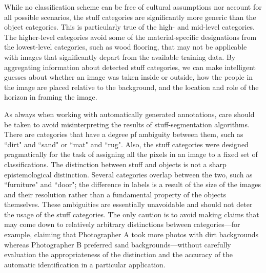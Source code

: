 \documentclass[10pt, a4paper]{article}
\begin{document}
While no classification scheme
can be free of cultural assumptions nor account for all possible scenarios,
the stuff categories are significantly more generic than the object categories.
This is particularly true of the high- and mid-level categories. The
higher-level categories avoid some of the material-specific designations from
the lowest-level categories, such as wood flooring, that may not be applicable
with images that significantly depart from the available training data. By
aggregating information about detected stuff categories, we can make intelligent
guesses about whether an image was taken inside or outside, how the people in
the image are placed relative to the background, and the location and role of
the horizon in framing the image.

As always when working with automatically generated annotations, care should be
taken to avoid misinterpreting the results of stuff-segmentation algorithms.
There are categories that have a degree pf ambiguity between them, such as ``dirt"
and ``sand" or ``mat" and ``rug". Also, the stuff categories were designed
pragmatically for the task of assigning all the pixels in an image to a
fixed set of classifications. The distinction between stuff and objects is not
a sharp epistemological distinction. Several categories overlap between the
two, such as ``furniture" and ``door"; the difference in labels is a result of
the size of the images and their resolution rather than a fundamental property
of the objects themselves. These ambiguities are essentially unavoidable and
should not deter the usage of the stuff categories. The only caution is to
avoid making claims that may come down to relatively arbitrary distinctions
between categories---for example, claiming that Photographer A took more photos
with dirt backgrounds whereas Photographer B preferred sand backgrounds---without
carefully evaluation the appropriateness of the distinction and the accuracy
of the automatic identification in a particular application.
\end{document}
